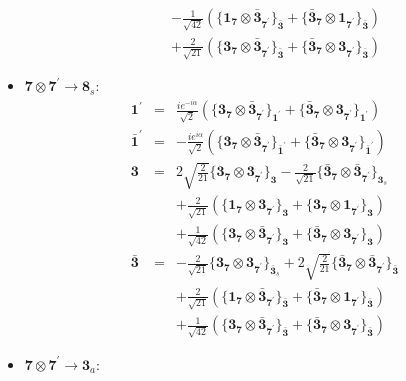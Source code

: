 \documentclass[english]{article}
\newcommand{\subcg}[3]{\big\{ {#1}\otimes{#2}\big\}^{}_{#3}}
\newcommand{\rep}[1]{\mathbf{#1}}
\begin{document}
\begin{itemize}
\begin{eqnarray*}
 & & -\frac{1}{\sqrt{42}}\left(\subcg{\rep{1}_{\rep{7}}}{\rep{\bar{3}}_{\rep{7^{\prime}}}}{\rep{\bar{3}}}+\subcg{\rep{\bar{3}}_{\rep{7}}}{\rep{1}_{\rep{7^{\prime}}}}{\rep{\bar{3}}}\right) \\ 
 & & +\frac{2}{\sqrt{21}}\left(\subcg{\rep{3}_{\rep{7}}}{\rep{\bar{3}}_{\rep{7^{\prime}}}}{\rep{\bar{3}}}+\subcg{\rep{\bar{3}}_{\rep{7}}}{\rep{3}_{\rep{7^{\prime}}}}{\rep{\bar{3}}}\right)
\end{eqnarray*}
\item $\rep{7}\otimes\rep{7^{\prime}}\to\rep{8}_{s}$:
\begin{eqnarray*}
\rep{1^{\prime}} &=& \frac{i e^{-i \alpha }}{\sqrt{2}}\left(\subcg{\rep{3}_{\rep{7}}}{\rep{\bar{3}}_{\rep{7^{\prime}}}}{\rep{1^{\prime}}}+\subcg{\rep{\bar{3}}_{\rep{7}}}{\rep{3}_{\rep{7^{\prime}}}}{\rep{1^{\prime}}}\right)
\\
\rep{\bar{1}^{\prime}} &=& -\frac{i e^{i \alpha }}{\sqrt{2}}\left(\subcg{\rep{3}_{\rep{7}}}{\rep{\bar{3}}_{\rep{7^{\prime}}}}{\rep{\bar{1}^{\prime}}}+\subcg{\rep{\bar{3}}_{\rep{7}}}{\rep{3}_{\rep{7^{\prime}}}}{\rep{\bar{1}^{\prime}}}\right)
\\
\rep{3} &=& 2 \sqrt{\frac{2}{21}}\subcg{\rep{3}_{\rep{7}}}{\rep{3}_{\rep{7^{\prime}}}}{\rep{3}}-\frac{2}{\sqrt{21}}\subcg{\rep{\bar{3}}_{\rep{7}}}{\rep{\bar{3}}_{\rep{7^{\prime}}}}{\rep{3}_{s}} \\ 
 & & +\frac{2}{\sqrt{21}}\left(\subcg{\rep{1}_{\rep{7}}}{\rep{3}_{\rep{7^{\prime}}}}{\rep{3}}+\subcg{\rep{3}_{\rep{7}}}{\rep{1}_{\rep{7^{\prime}}}}{\rep{3}}\right) \\ 
 & & +\frac{1}{\sqrt{42}}\left(\subcg{\rep{3}_{\rep{7}}}{\rep{\bar{3}}_{\rep{7^{\prime}}}}{\rep{3}}+\subcg{\rep{\bar{3}}_{\rep{7}}}{\rep{3}_{\rep{7^{\prime}}}}{\rep{3}}\right)
\\
\rep{\bar{3}} &=& -\frac{2}{\sqrt{21}}\subcg{\rep{3}_{\rep{7}}}{\rep{3}_{\rep{7^{\prime}}}}{\rep{\bar{3}}_{s}}+2 \sqrt{\frac{2}{21}}\subcg{\rep{\bar{3}}_{\rep{7}}}{\rep{\bar{3}}_{\rep{7^{\prime}}}}{\rep{\bar{3}}} \\ 
 & & +\frac{2}{\sqrt{21}}\left(\subcg{\rep{1}_{\rep{7}}}{\rep{\bar{3}}_{\rep{7^{\prime}}}}{\rep{\bar{3}}}+\subcg{\rep{\bar{3}}_{\rep{7}}}{\rep{1}_{\rep{7^{\prime}}}}{\rep{\bar{3}}}\right) \\ 
 & & +\frac{1}{\sqrt{42}}\left(\subcg{\rep{3}_{\rep{7}}}{\rep{\bar{3}}_{\rep{7^{\prime}}}}{\rep{\bar{3}}}+\subcg{\rep{\bar{3}}_{\rep{7}}}{\rep{3}_{\rep{7^{\prime}}}}{\rep{\bar{3}}}\right)
\end{eqnarray*}
\item $\rep{7}\otimes\rep{7^{\prime}}\to\rep{3}_{a}$:

\end{itemize}
\end{document}
